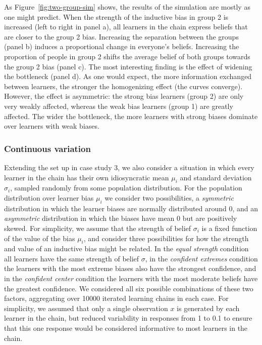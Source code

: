 \documentclass[doc]{apa6}
\begin{document}
As Figure~\ref{fig:two-group-sim} shows, the results of the simulation are mostly as one might predict. When the strength of the inductive bias in group 2 is increased (left to right in panel a), all learners in the chain express beliefs that are closer to the group 2 bias. Increasing the separation between the groups (panel b) induces a proportional change in everyone's beliefs. Increasing the proportion of people in group 2 shifts the average belief of both groups towards the group 2 bias (panel c). The most interesting finding is the effect of widening the bottleneck (panel d). As one would expect, the more information exchanged between learners, the stronger the homogenizing effect (the curves converge). However, the effect is asymmetric: the strong bias learners (group 2) are only very weakly affected, whereas the weak bias learners (group 1) are greatly affected. The wider the bottleneck, the more learners with strong biases dominate over learners with weak biases. 



\smallskip
\subsubsection{Continuous variation} Extending the set up in case study 3, we also consider a situation in which every learner in the chain has their own idiosyncratic mean $\mu_i$ and standard deviation $\sigma_i$, sampled randomly from some population distribution. For the population distribution over learner bias $\mu_i$ we consider two possibilities, a {\it symmetric} distribution in which the learner biases are normally distributed around 0, and an {\it asymmetric} distribution in which the biases have mean 0 but are positively skewed. For simplicity, we assume that the strength of belief $\sigma_i$ is a fixed function of the value of the bias $\mu_i$, and consider three possibilities for how the strength and value of an inductive bias might be related. In the {\it equal strength} condition all learners have the same strength of belief $\sigma$, in the {\it confident extremes} condition the learners with the most extreme biases also have the strongest confidence, and in the {\it confident center} condition the learners with the most moderate beliefs have the greatest confidence. We considered all six possible combinations of these two factors, aggregating over 10000 iterated learning chains in each case. For simplicity, we assumed that only a single observation $x$ is generated by each learner in the chain, but reduced variability in responses from 1 to 0.1 to ensure that this one response would be considered informative to most learners in the chain.
\end{document}

